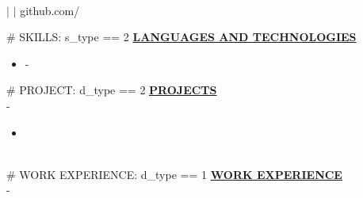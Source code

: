\documentclass{article}
\begin{document}
\begin{center}
\thispagestyle{empty}
\Large \textbf{ } \\
\normalsize 
    $\mid$  
    $\mid$ github.com/ 
~\\\hrulefill
\end{center}
\#{ SKILLS: s_type == 2 } 
\noindent \textbf{\underline{LANGUAGES AND TECHNOLOGIES}} 
\begin{itemize}[noitemsep,nolistsep,leftmargin=*]
    \item \textbf{} - 
\end{itemize}
\#{ PROJECT: d_type == 2 }              
\noindent \textbf{\underline{PROJECTS}} \\
\noindent \textbf{} \hfill {} - \\
\textit{} %
\begin{itemize}[noitemsep,nolistsep,leftmargin=*]
    \item \textbf{} 
\end{itemize}
        ~\\
\#{ WORK EXPERIENCE: d_type == 1 }
\noindent \textbf{\underline{WORK EXPERIENCE}} \\
\noindent \textbf{} \hfill {} - \\
\textit{} \hfill \textit{} %
\end{document}
